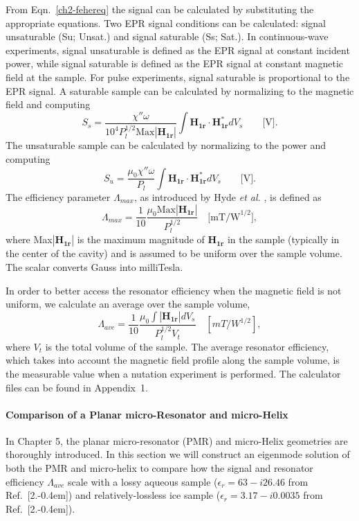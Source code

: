 From Eqn.~\ref{ch2-fehereq} the signal can be calculated by substituting the appropriate equations. Two EPR signal conditions can be calculated: signal unsaturable (Su; Unsat.) and signal saturable (Ss; Sat.). In continuous-wave  experiments, signal unsaturable is defined as the EPR signal at constant incident power, while signal saturable is defined as the EPR signal at constant magnetic field at the sample. For pulse experiments, signal saturable is proportional to the EPR signal. A saturable sample can be calculated by normalizing to the magnetic field and computing
\begin{equation}
    S_s = \frac{\chi'' \omega}{10^4 P_l^{1/2} \text{Max}|\mathbf{H_{1r}}|} \int \mathbf{H_{1r}} \cdot \mathbf{H_{1r}^*} dV_s \qquad \text{[V]}. \label{ch2-eq:ss}
\end{equation}{}
The unsaturable sample can be calculated by normalizing to the power and computing
\begin{equation}
    S_u = \frac{\mu_0 \chi'' \omega}{P_l} \int \mathbf{H_{1r}} \cdot \mathbf{H_{1r}^*} dV_s \qquad  \text{[V]}. \label{ch2-eq:su}
\end{equation}{}
The efficiency parameter $\Lambda_{max}$, as introduced by Hyde {\em et al.} \cite{hydehoff}, is defined as
\begin{equation}
    \Lambda_{max} = \frac{1}{10}\frac{\mu_0 \text{Max}|\mathbf{H_{1r}}|}{P_l^{1/2}} \quad \text{[mT/W}^{1/2}],
\end{equation}
where Max$|\mathbf{H_{1r}}|$ is the maximum magnitude of $\mathbf{H_{1r}}$ in the sample (typically in the center of the cavity) and is assumed to be uniform over the sample volume. \cite{hydehoff} The scalar converts Gauss into milliTesla. 

In order to better access the resonator efficiency when the magnetic field is not uniform, we calculate an average over the sample volume, 
\begin{equation}
    \Lambda_{ave} = \frac{1}{10}\frac{\mu_0 \int |\mathbf{H_{1r}}| dV_s}{P_l^{1/2} V_t} \quad [mT/W^{1/2}], \label{eq:lamave}
\end{equation}
where $V_t$ is the total volume of the sample. The average resonator efficiency, which takes into account the magnetic field profile along the sample volume, is the measurable value when a nutation experiment is performed. The calculator files can be found in Appendix~1.

\paragraph*{Comparison of a Planar micro-Resonator and micro-Helix}
In Chapter 5, the planar micro-resonator (PMR) \cite{Suter2005,Suter2008,suter2015} and micro-Helix geometries are thoroughly introduced. In this section we will construct an eigenmode solution of both the PMR and micro-helix to compare how the signal and resonator efficiency $\Lambda_{ave}$ scale with a lossy aqueous sample ($\epsilon_r = 63 - i26.46$ from Ref.~[2.\kern-0.4em]) and relatively-lossless ice sample ($\epsilon_r=3.17-i0.0035$ from Ref.~[2.\kern-0.4em]). 

